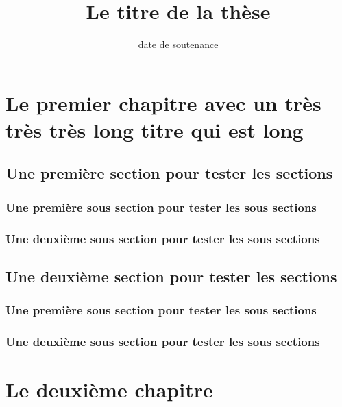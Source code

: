 \documentclass{esithesis}
\date{date de soutenance}
\title{Le titre de la thèse}
\begin{document}
\maketitle

\mainmatter

\chapter{Le premier chapitre avec un très très très long titre qui est long}

\section{Une première section pour tester les sections}

\lipsum[1-1]

\subsection{Une première sous section pour tester les sous sections}

\lipsum[1-6]

\subsection{Une deuxième sous section pour tester les sous sections}

\lipsum[1-6]

\section{Une deuxième section pour tester les sections}

\lipsum[1-1]

\subsection{Une première sous section pour tester les sous sections}

\lipsum[1-6]

\subsection{Une deuxième sous section pour tester les sous sections}

\lipsum[1-6]

\chapter{Le deuxième chapitre}
\end{document}
